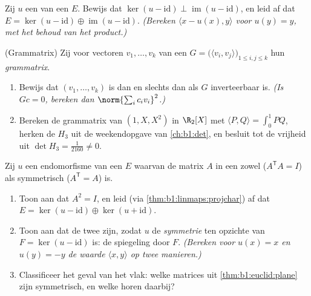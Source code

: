 \begin{exercise}[$\star\star\star$]\label{exo:b1:euclid:10}
Zij $u$ een  van een  $E$. Bewijs dat
$\ker(u - \mathrm{id}) \perp \operatorname{im}(u - \mathrm{id})$,
en leid af dat $E = \ker(u - \mathrm{id}) \oplus \operatorname{im}(u
- \mathrm{id})$. \emph{(Bereken $\langle x - u(x), y\rangle$ voor
$u(y) = y$, met het behoud van het product.)}
\end{exercise}

\begin{exercise}[$\star\star$]\label{exo:b1:euclid:11}
(Grammatrix) Zij voor vectoren $v_1, \dots, v_k$ van een
 $G = \bigl(\langle v_i, v_j\rangle\bigr)_{1 \leq
i, j \leq k}$ hun \emph{grammatrix}.
\begin{enumerate}
  \item Bewijs dat $(v_1, \dots, v_k)$  is dan en slechts dan
        als $G$ inverteerbaar is. \emph{(Is $Gc = 0$, bereken dan
        $\norm{\sum_i c_i v_i}^2$.)}
  \item Bereken de grammatrix van $(1, X, X^2)$ in $\R_2[X]$ met
        $\langle P, Q\rangle = \int_0^1 PQ$, herken de
         $H_3$ uit de weekendopgave van
        \cref{ch:b1:det}, en besluit tot de vrijheid uit $\det H_3
        = \frac1{2160} \neq 0$.
\end{enumerate}
\end{exercise}

\begin{exercise}[$\star\star\star$]\label{exo:b1:euclid:12}
Zij $u$ een endomorfisme van een  $E$ waarvan de
matrix $A$ in een   zowel  ($A^{\mathsf
T}A = I$) als symmetrisch ($A^{\mathsf T} = A$) is.
\begin{enumerate}
  \item Toon aan dat $A^2 = I$, en leid (via
        \cref{thm:b1:linmaps:projchar}) af dat $E = \ker(u -
        \mathrm{id}) \oplus \ker(u + \mathrm{id})$.
  \item Toon aan dat de twee   zijn, zodat
        $u$ de \emph{ symmetrie} ten opzichte van $F =
        \ker(u - \mathrm{id})$ is: de spiegeling door $F$.
        \emph{(Bereken voor $u(x) = x$ en $u(y) = -y$ de waarde
        $\langle x, y\rangle$ op twee manieren.)}
  \item Classificeer het geval van het vlak: welke matrices uit
        \cref{thm:b1:euclid:plane} zijn symmetrisch, en welke
         horen daarbij?
\end{enumerate}
\end{exercise}

